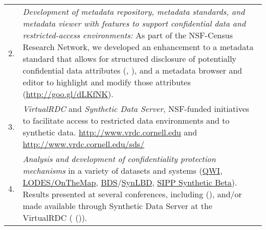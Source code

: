 \documentclass[10pt,letterpaper]{article}
\begin{document}
\begin{longtable}{lp{6.3in}}
2. &{{\it Development of metadata repository, metadata standards, and metadata viewer with features to support confidential data and restricted-access environments:} As part of the NSF-Census Research Network, we developed an enhancement to a metadata standard that allows for structured disclosure of potentially confidential data attributes (\citeauthor{AbowdVilhuberBlock2012}, \citeyear{AbowdVilhuberBlock2012}), and a metadata browser and editor to highlight and modify those attributes (\href{http://goo.gl/dLKfNK}{http://goo.gl/dLKfNK}).}\\


3. &{{\it VirtualRDC} and {\it Synthetic Data Server}, NSF-funded initiatives to facilitate access to restricted data environments and to synthetic data. \url{http://www.vrdc.cornell.edu} and \url{http://www.vrdc.cornell.edu/sds/}}\\


4. &{{\it Analysis and development of confidentiality protection mechanisms} in a variety of 
datasets and systems (\href{http://lehd.ces.census.gov/data}{QWI}, 
\href{http://lehd.ces.census.gov/data}{LODES/OnTheMap}, 
\href{https://www.census.gov/ces/dataproducts/bds/}{BDS}/\href{https://www.census.gov/ces/dataproducts/synlbd/index.html}{SynLBD},
\href{http://www.census.gov/programs-surveys/sipp/methodology/sipp-synthetic-beta-data-product.html}{SIPP
 Synthetic Beta}). Results presented
   at several conferences, including \citeauthor*{AbowdEtAl2012} (\citeyear{AbowdEtAl2012})}, 
   and/or made available through Synthetic Data Server at the VirtualRDC (\citeauthor{vrdc} 
   (\citeyear{vrdc})).\\


\end{longtable}
\end{document}
